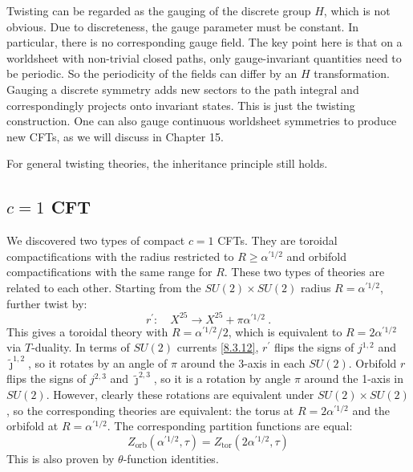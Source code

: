 Twisting can be regarded as the gauging of the discrete group $H$, which is not obvious. Due to discreteness, the gauge parameter must be constant. In particular, there is no corresponding gauge field. The key point here is that on a worldsheet with non-trivial closed paths, only gauge-invariant quantities need to be periodic. 
So the periodicity of the fields can differ by an $H$ transformation. Gauging a discrete symmetry adds new sectors to the path integral and correspondingly projects onto invariant states. This is just the twisting construction. One can also gauge continuous worldsheet symmetries to produce new CFTs, as we will discuss in Chapter 15.

For general twisting theories, the inheritance principle still holds.

\subsection*{$c=1$ CFT}	

We discovered two types of compact $c=1$ CFTs. They are toroidal compactifications with the radius restricted to $R \geq \alpha^{\prime 1/2}$ and orbifold compactifications with the same range for $R$. 
These two types of theories are related to each other. 
Starting from the $S U(2) \times S U(2)$ radius $R=\alpha^{\prime 1/2}$, further twist by:
\begin{equation}
	r^{\prime}: \quad X^{25} \rightarrow X^{25}+\pi \alpha^{\prime 1/2} \:. \label{8.5.20} 
\end{equation}
This gives a toroidal theory with $R=\alpha^{\prime 1/2}/2$, which is equivalent to $R=2 \alpha^{\prime 1/2}$ via $T$-duality. 
In terms of $SU(2)$ currents \eqref{8.3.12}, $r^{\prime}$ flips the signs of $j^{1,2}$ and $\tilde{\jmath}^{1,2}$, 
so it rotates by an angle of $\pi$ around the 3-axis in each $S U(2) $. 
Orbifold $r$ flips the signs of $j^{2,3}$ and $\tilde{\jmath}^{2,3}$, 
so it is a rotation by angle $\pi$ around the 1-axis in $SU(2)$. However, clearly these rotations are equivalent under $S U(2) \times S U(2)$, so the corresponding theories are equivalent: 
the torus at $R=2 \alpha^{\prime 1/2}$ and the orbifold at $R=\alpha^{\prime 1/2}$. 
The corresponding partition functions are equal:
\begin{equation}
	Z_{\text{orb}}(\alpha^{\prime 1/2}, \tau)=Z_{\text{tor}}(2 \alpha^{\prime 1/2}, \tau) \label{8.5.21}
\end{equation}
This is also proven by $\theta$-function identities.

